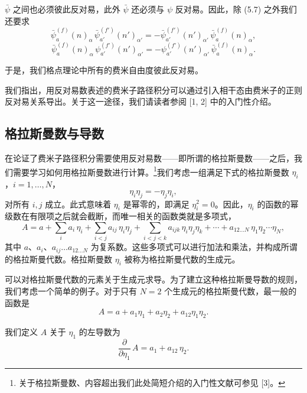 $\bar{\psi}$ 之间也必须彼此反对易，此外 $\bar{\psi}$ 还必须与 $\psi$ 反对易。因此，除 (5.7) 之外我们还要求
\begin{equation}
  \bar{\psi}^{(f)}_{a}(n)_{\alpha}\,
  \bar{\psi}^{(f')}_{a'}(n')_{\alpha'}
  = -\bar{\psi}^{(f')}_{a'}(n')_{\alpha'}\,
  \bar{\psi}^{(f)}_{a}(n)_{\alpha} ,
\end{equation}
\begin{equation}
  \bar{\psi}^{(f)}_{a}(n)_{\alpha}\,
  \psi^{(f')}_{a'}(n')_{\alpha'}
  = -\psi^{(f')}_{a'}(n')_{\alpha'}\,
  \bar{\psi}^{(f)}_{a}(n)_{\alpha} .
\end{equation}

于是，我们格点理论中所有的费米自由度彼此反对易。

我们指出，用反对易数表述的费米子路径积分可以通过引入相干态由费米子的正则反对易关系导出。关于这一途径，我们请读者参阅 [1, 2] 中的入门性介绍。

\subsection{格拉斯曼数与导数}

在论证了费米子路径积分需要使用反对易数——即所谓的格拉斯曼数——之后，我们需要学习如何用格拉斯曼数进行计算。\footnote{关于格拉斯曼数、内容超出我们此处简短介绍的入门性文献可参见 [3]。}我们考虑一组满足下式的格拉斯曼数 $\eta_i$，$i = 1, \ldots, N$，
\begin{equation}
  \eta_i \eta_j = -\eta_j \eta_i ,
\end{equation}
对所有 $i, j$ 成立。此式意味着 $\eta_i$ 是幂零的，即满足 $\eta_i^2 = 0$。因此，$\eta_i$ 的函数的幂级数在有限项之后就会截断，而唯一相关的函数类就是多项式，
\begin{equation}
  A = a + \sum_i a_i\,\eta_i + \sum_{i<j} a_{ij}\,\eta_i\eta_j
      + \sum_{i<j<k} a_{ijk}\,\eta_i\eta_j\eta_k + \cdots
      + a_{12\ldots N}\,\eta_1\eta_2\cdots\eta_N ,
\end{equation}
其中 $a$、$a_i$、$a_{ij} \ldots a_{12\ldots N}$ 为复系数。这些多项式可以进行加法和乘法，并构成所谓的格拉斯曼代数。格拉斯曼数 $\eta_i$ 被称为格拉斯曼代数的生成元。

可以对格拉斯曼代数的元素关于生成元求导。为了建立这种格拉斯曼导数的规则，我们考虑一个简单的例子。对于只有 $N = 2$ 个生成元的格拉斯曼代数，最一般的函数是
\begin{equation}
  A = a + a_1\eta_1 + a_2\eta_2 + a_{12}\eta_1\eta_2 .
\end{equation}

我们定义 $A$ 关于 $\eta_1$ 的左导数为
\begin{equation}
  \frac{\partial}{\partial\eta_1}\,A = a_1 + a_{12}\,\eta_2 .
\end{equation}

